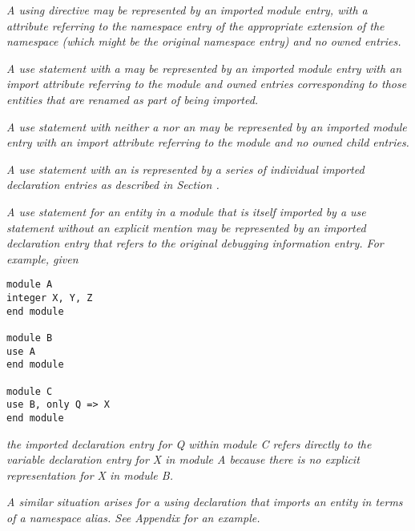 \textit{A  using directive
may be represented by an imported module
\hypertarget{chap:DWATimportnamespaceusingdirective}{}
entry, with a \DWATimportDEFN{} attribute referring to the namespace
entry of the appropriate extension of the namespace (which
might be the original namespace entry) and no owned entries.
}

\textit{A  use statement 
with a  may be
represented by an imported module entry with an import
attribute referring to the module and owned entries
corresponding to those entities that are renamed as part of
being imported.
}

\textit{A  use statement
with neither a  nor
an  may be represented by an imported module
entry with an import attribute referring to the module and
no owned child entries.
}

\textit{A use statement with an  is represented by a
series of individual imported declaration entries as described
in Section .
}

\textit{A  use statement for an entity in a module that is
itself imported by a use statement without an explicit mention
may be represented by an imported declaration entry that refers
to the original debugging information entry. For example, given
}

\begin{lstlisting}
module A
integer X, Y, Z
end module

module B
use A
end module

module C
use B, only Q => X
end module
\end{lstlisting}

\textit{the imported declaration entry for Q within module C refers
directly to the variable declaration entry for X in module A
because there is no explicit representation for X in module B.
}

\textit{A similar situation arises for a  using declaration
that imports an entity in terms of a namespace alias. See 
Appendix  
for an example.
}


